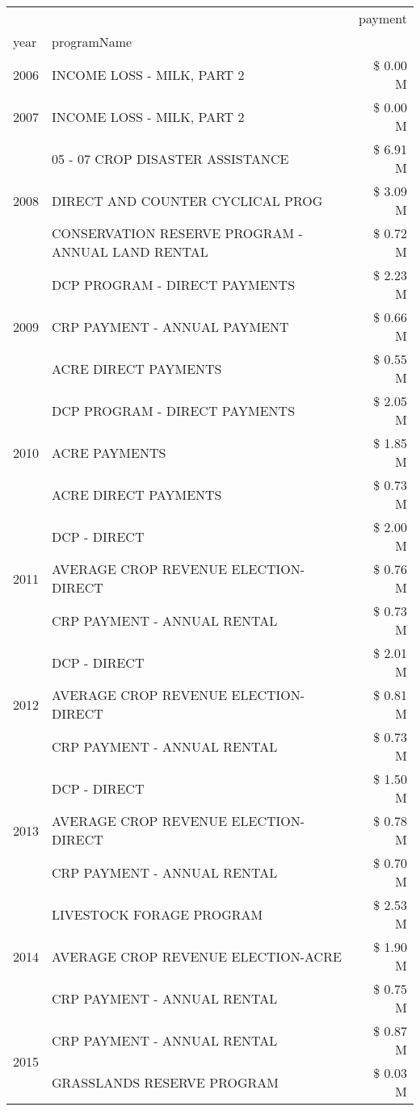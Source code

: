 \begin{tabular}{llr}
\toprule
 &  & payment \\
year & programName &  \\
\midrule
2006 & INCOME LOSS - MILK, PART 2 & \$ 0.00 M \\
\cline{1-3}
2007 & INCOME LOSS - MILK, PART 2 & \$ 0.00 M \\
\cline{1-3}
\multirow[t]{3}{*}{2008} & 05 - 07 CROP DISASTER ASSISTANCE & \$ 6.91 M \\
 & DIRECT AND COUNTER CYCLICAL PROG & \$ 3.09 M \\
 & CONSERVATION RESERVE PROGRAM - ANNUAL LAND RENTAL & \$ 0.72 M \\
\cline{1-3}
\multirow[t]{3}{*}{2009} & DCP PROGRAM - DIRECT PAYMENTS & \$ 2.23 M \\
 & CRP PAYMENT - ANNUAL PAYMENT & \$ 0.66 M \\
 & ACRE DIRECT PAYMENTS & \$ 0.55 M \\
\cline{1-3}
\multirow[t]{3}{*}{2010} & DCP PROGRAM - DIRECT PAYMENTS & \$ 2.05 M \\
 & ACRE PAYMENTS & \$ 1.85 M \\
 & ACRE DIRECT PAYMENTS & \$ 0.73 M \\
\cline{1-3}
\multirow[t]{3}{*}{2011} & DCP - DIRECT & \$ 2.00 M \\
 & AVERAGE CROP REVENUE ELECTION-DIRECT & \$ 0.76 M \\
 & CRP PAYMENT - ANNUAL RENTAL & \$ 0.73 M \\
\cline{1-3}
\multirow[t]{3}{*}{2012} & DCP - DIRECT & \$ 2.01 M \\
 & AVERAGE CROP REVENUE ELECTION-DIRECT & \$ 0.81 M \\
 & CRP PAYMENT - ANNUAL RENTAL & \$ 0.73 M \\
\cline{1-3}
\multirow[t]{3}{*}{2013} & DCP - DIRECT & \$ 1.50 M \\
 & AVERAGE CROP REVENUE ELECTION-DIRECT & \$ 0.78 M \\
 & CRP PAYMENT - ANNUAL RENTAL & \$ 0.70 M \\
\cline{1-3}
\multirow[t]{3}{*}{2014} & LIVESTOCK FORAGE PROGRAM & \$ 2.53 M \\
 & AVERAGE CROP REVENUE ELECTION-ACRE & \$ 1.90 M \\
 & CRP PAYMENT - ANNUAL RENTAL & \$ 0.75 M \\
\cline{1-3}
\multirow[t]{3}{*}{2015} & CRP PAYMENT - ANNUAL RENTAL & \$ 0.87 M \\
 & GRASSLANDS RESERVE PROGRAM & \$ 0.03 M \\

\end{tabular}
